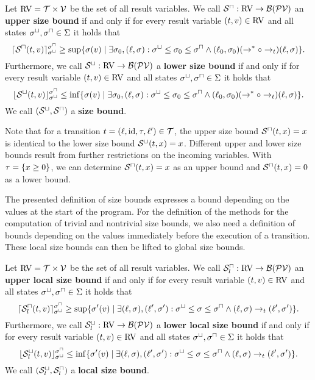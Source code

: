 \begin{definition}
  Let $\text{RV} = \mathcal{T} \times \mathcal{V}$ be the set of all result variables.
  We call ${\mathcal{S}^\sqcap}: \text{RV} \rightarrow \mathcal{B}(\mathcal{PV})$ an \textbf{upper size bound} if and only if for every result variable $(t, v) \in \text{RV}$ and all states ${\sigma^\sqcup}, {\sigma^\sqcap} \in \Sigma$ it holds that
  \[ \lceil {\mathcal{S}^\sqcap}(t, v) \rceil^{{\sigma^\sqcap}}_{{\sigma^\sqcup}} \geq \sup \lbrace  \sigma(v) \mid \exists \sigma_0, (\ell, \sigma): {\sigma^\sqcup} \leq \sigma_0 \leq {\sigma^\sqcap} \wedge (\ell_0, \sigma_0) (\rightarrow^* \circ \rightarrow_t) (\ell, \sigma) \rbrace. \]
  Furthermore, we call ${\mathcal{S}^\sqcup}: \text{RV} \rightarrow \mathcal{B}(\mathcal{PV})$ a \textbf{lower size bound} if and only if for every result variable $(t, v) \in \text{RV}$ and all states ${\sigma^\sqcup}, {\sigma^\sqcap} \in \Sigma$ it holds that
  \[ \lfloor {\mathcal{S}^\sqcup}(t, v) \rfloor^{{\sigma^\sqcap}}_{{\sigma^\sqcup}} \leq \inf \lbrace  \sigma(v) \mid \exists \sigma_0, (\ell, \sigma): {\sigma^\sqcup} \leq \sigma_0 \leq {\sigma^\sqcap} \wedge (\ell_0, \sigma_0) (\rightarrow^* \circ \rightarrow_t) (\ell, \sigma) \rbrace. \]
  We call ${({\mathcal{S}^\sqcup}, {\mathcal{S}^\sqcap})}$ a \textbf{size bound}.
\end{definition}

Note that for a transition $t = (\ell,\text{id},\tau,\ell') \in \mathcal{T}$, the upper size bound ${\mathcal{S}^\sqcap}(t,x) = x$ is identical to the lower size bound ${\mathcal{S}^\sqcup}(t,x) = x$.
Different upper and lower size bounds result from further restrictions on the incoming variables.
With $\tau = \lbrace x \geq 0 \rbrace$, we can determine ${\mathcal{S}^\sqcap}(t,x) = x$ as an upper bound and ${\mathcal{S}^\sqcap}(t,x) = 0$ as a lower bound.

The presented definition of size bounds expresses a bound depending on the values at the start of the program.
For the definition of the methods for the computation of trivial and nontrivial size bounds, we also need a definition of bounds depending on the values immediately before the execution of a transition.
These local size bounds can then be lifted to global size bounds.

\begin{definition}
  Let $\text{RV} = \mathcal{T} \times \mathcal{V}$ be the set of all result variables.
  We call ${\mathcal{S}^\sqcap_l}: \text{RV} \rightarrow \mathcal{B}(\mathcal{PV})$ an \textbf{upper local size bound} if and only if for every result variable $(t, v) \in \text{RV}$ and all states ${\sigma^\sqcup}, {\sigma^\sqcap} \in \Sigma$ it holds that
  \[ \lceil {\mathcal{S}^\sqcap_l}(t, v) \rceil^{{\sigma^\sqcap}}_{{\sigma^\sqcup}} \geq \sup \lbrace \sigma'(v) \mid \exists (\ell, \sigma), (\ell', \sigma'): {\sigma^\sqcup} \leq \sigma \leq {\sigma^\sqcap} \wedge (\ell, \sigma) \rightarrow_t (\ell', \sigma') \rbrace. \]
  Furthermore, we call ${\mathcal{S}^\sqcup_l}: \text{RV} \rightarrow \mathcal{B}(\mathcal{PV})$ a \textbf{lower local size bound} if and only if for every result variable $(t, v) \in \text{RV}$ and all states ${\sigma^\sqcup}, {\sigma^\sqcap} \in \Sigma$ it holds that
  \[ \lfloor {\mathcal{S}^\sqcup_l}(t, v) \rfloor^{{\sigma^\sqcap}}_{{\sigma^\sqcup}} \leq \inf \lbrace \sigma'(v) \mid \exists (\ell, \sigma), (\ell', \sigma'): {\sigma^\sqcup} \leq \sigma \leq {\sigma^\sqcap} \wedge (\ell, \sigma) \rightarrow_t (\ell', \sigma') \rbrace. \]
  We call ${({\mathcal{S}^\sqcup_l}, {\mathcal{S}^\sqcap_l})}$ a \textbf{local size bound}.
\end{definition}

